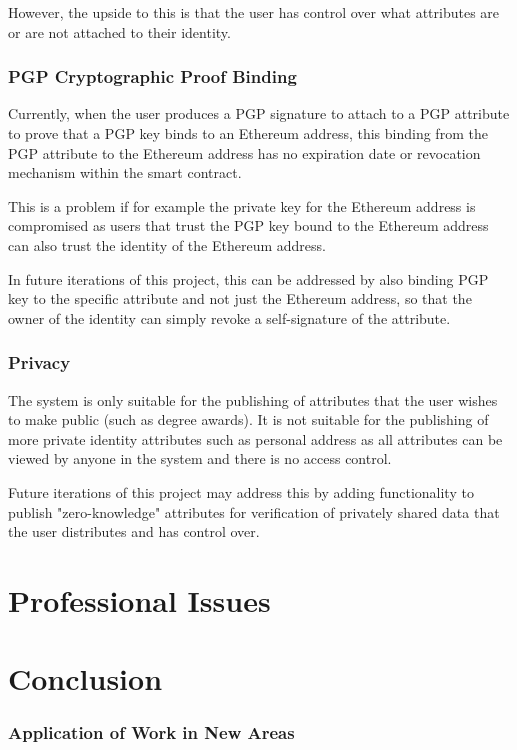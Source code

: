 \documentclass[12pt,a4paper]{report}
\begin{document}
	However, the upside to this is that the user has control over what attributes are or are not attached to their identity.
	
	\subsection{PGP Cryptographic Proof Binding}
	Currently, when the user produces a PGP signature to attach to a PGP attribute to prove that a PGP key binds to an Ethereum address, this binding from the PGP attribute to the Ethereum address has no expiration date or revocation mechanism within the smart contract.
	
	This is a problem if for example the private key for the Ethereum address is compromised as users that trust the PGP key bound to the Ethereum address can also trust the identity of the Ethereum address.
	
	In future iterations of this project, this can be addressed by also binding PGP key to the specific attribute and not just the Ethereum address, so that the owner of the identity can simply revoke a self-signature of the attribute.
	
	\subsection{Privacy}
	The system is only suitable for the publishing of attributes that the user wishes to make public (such as degree awards). It is not suitable for the publishing of more private identity attributes such as personal address as all attributes can be viewed by anyone in the system and there is no access control.
	
	Future iterations of this project may address this by adding functionality to publish "zero-knowledge" attributes for verification of privately shared data that the user distributes and has control over.
	
	\chapter{Professional Issues}
	
	\chapter{Conclusion}
	\subsection{Application of Work in New Areas}
	
\end{document}
